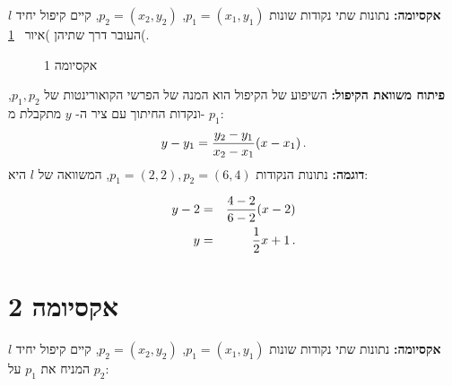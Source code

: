 \textbf{אקסיומה:} 
נתונות שתי נקודות שונות
$p_1=(x_1,y_1)$, $p_2=(x_2,y_2)$,
קיים קיפול יחיד
$l$
העובר דרך שתיהן )איור~%
\ref{f.axiom1}(.
\begin{figure}[tb]
\begin{center}

\end{center}
\caption{אקסיומה 1}\label{f.axiom1}
\end{figure}

\textbf{פיתוח משוואת הקיפול:}
השיפוע של הקיפול הוא המנה של הפרשי הקואורינטות של
$p_1,p_2$,
ונקדות החיתוך עם ציר ה-%
$y$
מתקבלת מ-%
$p_1$:
\[
y - y_1 = \displaystyle\frac{y_2-y_1}{x_2-x_1}(x-x_1)\,.
\]
\textbf{דוגמה:}
נתונות הנקודות
$p_1=(2,2), p_2=(6,4)$,
המשוואה של 
$l$  היא:

\begin{eqnarray*}
y-2&=&\displaystyle\frac{4-2}{6-2}(x-2)\\
y&=&\displaystyle\frac{1}{2}x+1\,.
\end{eqnarray*}





\section{אקסיומה 2}\label{s.ax2}


\textbf{אקסיומה:}
נתונות שתי נקודות שונות
$p_1=(x_1,y_1)$, $p_2=(x_2,y_2)$,
קיים קיפול יחיד 
$l$
המניח את
$p_1$
על
$p_2$:


